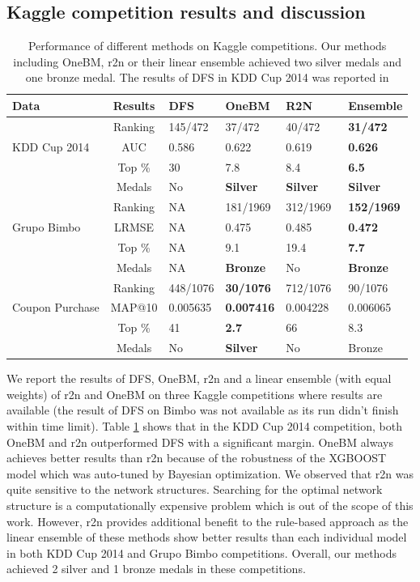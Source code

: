\subsection{Kaggle competition results and discussion}
\begin{table}
  \begin{center}

  \caption{Performance of different methods on Kaggle competitions. Our methods including OneBM, r2n or their linear ensemble achieved two silver medals and one bronze medal. The results of DFS in KDD Cup 2014 was reported in \cite{DFS}}   \label{tab:results} 
  \begin{tabular}{ | l | c | l | l |l|l|}
    \hline
    \textbf{Data} & \textbf{Results} & \textbf{DFS} & \textbf{OneBM} & \textbf{R2N} & \textbf{Ensemble} \\ \hline
    & Ranking &  145/472 & 37/472  & 40/472  &\textbf{31/472}  \\ 
    KDD Cup 2014 & AUC &  0.586 &  0.622 & 0.619 & \textbf{0.626}  \\ 
    & Top \% &  30 &  7.8& 8.4 & \textbf{6.5} \\ 
    & Medals &  No &  \textbf{Silver} & \textbf{Silver} &  \textbf{Silver} \\ \hline
    & Ranking &  NA &  181/1969 & 312/1969 &  \textbf{152/1969}\\ 
    Grupo Bimbo & LRMSE &  NA &  0.475 & 0.485 &  \textbf{0.472}   \\ 
    & Top \% &  NA &  9.1 & 19.4 & \textbf{7.7} \\ 
    & Medals &  NA &  \textbf{Bronze} & No & \textbf{Bronze} \\ \hline
    & Ranking & 448/1076 &  \textbf{30/1076} & 712/1076\ & 90/1076 \\ 
    Coupon Purchase & MAP@10 &  0.005635 &  \textbf{0.007416} & 0.004228&  0.006065 \\ 
    & Top \% &  41 &  \textbf{2.7} & 66 & 8.3\\ 
    & Medals &  No &  \textbf{Silver} & No & Bronze \\ \hline
  \end{tabular}
  \end{center}
\end{table}
We report the results of DFS, OneBM, r2n and a linear ensemble (with equal weights) of r2n and OneBM on three Kaggle competitions where results are available (the result of DFS on Bimbo was not available as its run didn't finish within time limit). Table \ref{tab:results} shows that in the KDD Cup 2014 competition, both OneBM and r2n outperformed DFS with a significant margin. OneBM always achieves  better results than r2n because of the robustness of the XGBOOST model which was auto-tuned by Bayesian optimization. We observed that r2n was quite sensitive to the network structures.  Searching for the optimal network structure is a computationally expensive problem which is  out of the scope of this work. However, r2n provides additional benefit to the rule-based approach  as the linear ensemble of these methods show better results than each individual model in both KDD Cup 2014 and Grupo Bimbo competitions. Overall, our methods achieved 2 silver and 1 bronze medals in these competitions. 
 
